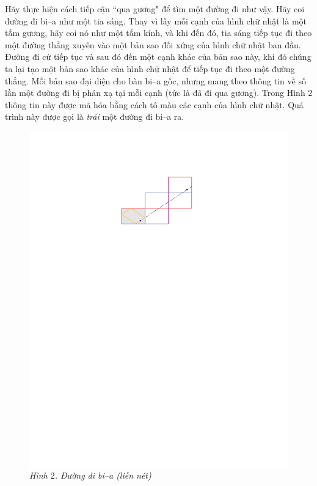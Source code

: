 \begin{multicols}{2}
	\vskip 0.1cm
	Hãy thực hiện cách tiếp cận ``qua gương" để tìm một đường đi như vậy. Hãy coi đường đi bi--a như một tia sáng. Thay vì lấy mỗi cạnh của hình chữ nhật là một tấm gương, hãy coi nó như một tấm kính, và khi đến đó, tia sáng tiếp tục đi theo một đường thẳng xuyên vào một bản sao đối xứng của hình chữ nhật ban đầu.  Đường đi cứ tiếp tục và sau đó đến một cạnh khác của bản sao này, khi đó chúng ta lại tạo một bản sao khác của hình chữ nhật để tiếp tục đi theo một đường thẳng.
	\vskip 0.1cm
	Mỗi bản sao đại diện cho bàn bi--a gốc, nhưng mang theo thông tin về số lần một  đường đi bị phản xạ tại mỗi cạnh (tức là đã đi qua gương). Trong Hình $2$ thông tin này được mã hóa bằng cách tô màu các cạnh của hình chữ nhật. Quá trình này được gọi là \emph{trải} một đường đi bi--a ra.
	\begin{figure}[H]
		\vspace*{-5pt}
		\centering
		\captionsetup{labelformat= empty, justification=centering}
		\includegraphics[width= 1\linewidth]{2}
		\caption{\small\textit{\color{duongvaotoanhoc}Hình $2$. Đường đi bi--a (liền nét)
}}
\end{figure}
\end{multicols}
